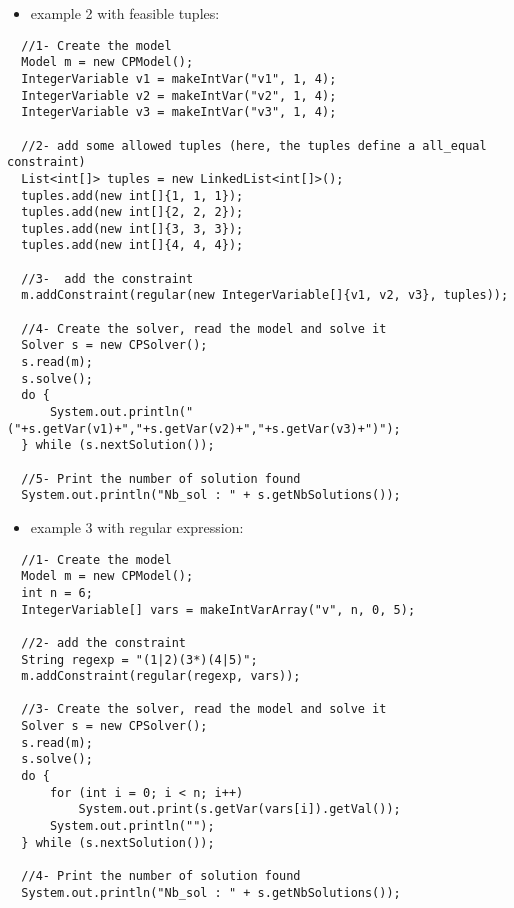\begin{itemize}
	\item example 2 with feasible tuples:
\end{itemize}

\begin{lstlisting}
  //1- Create the model
  Model m = new CPModel();
  IntegerVariable v1 = makeIntVar("v1", 1, 4);
  IntegerVariable v2 = makeIntVar("v2", 1, 4);
  IntegerVariable v3 = makeIntVar("v3", 1, 4);
	
  //2- add some allowed tuples (here, the tuples define a all_equal constraint)
  List<int[]> tuples = new LinkedList<int[]>();
  tuples.add(new int[]{1, 1, 1});
  tuples.add(new int[]{2, 2, 2});
  tuples.add(new int[]{3, 3, 3});
  tuples.add(new int[]{4, 4, 4});
	
  //3-  add the constraint
  m.addConstraint(regular(new IntegerVariable[]{v1, v2, v3}, tuples));
	
  //4- Create the solver, read the model and solve it
  Solver s = new CPSolver();	
  s.read(m);
  s.solve();
  do {
      System.out.println("("+s.getVar(v1)+","+s.getVar(v2)+","+s.getVar(v3)+")");
  } while (s.nextSolution());
	
  //5- Print the number of solution found
  System.out.println("Nb_sol : " + s.getNbSolutions());
\end{lstlisting}

\begin{itemize}
	\item example 3 with regular expression:
\end{itemize}

\begin{lstlisting}
  //1- Create the model
  Model m = new CPModel();
  int n = 6;
  IntegerVariable[] vars = makeIntVarArray("v", n, 0, 5);

  //2- add the constraint
  String regexp = "(1|2)(3*)(4|5)";
  m.addConstraint(regular(regexp, vars));
	
  //3- Create the solver, read the model and solve it
  Solver s = new CPSolver();
  s.read(m);
  s.solve();
  do {
      for (int i = 0; i < n; i++)
          System.out.print(s.getVar(vars[i]).getVal());
      System.out.println("");
  } while (s.nextSolution());
	
  //4- Print the number of solution found
  System.out.println("Nb_sol : " + s.getNbSolutions());
\end{lstlisting}

